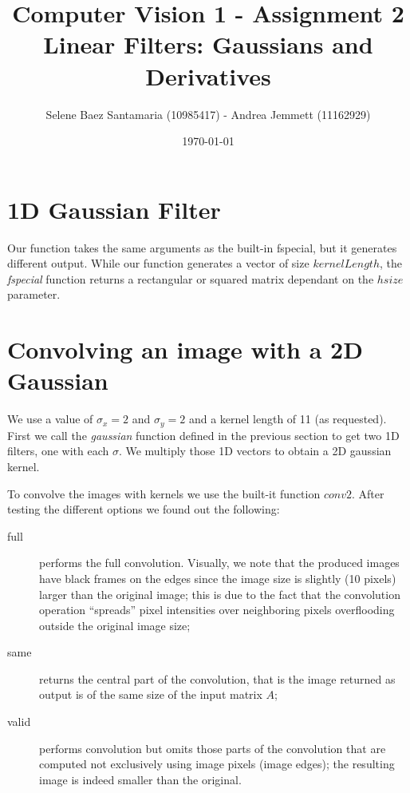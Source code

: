 \documentclass[11pt]{article}
\title{
	{Computer Vision 1 - Assignment 2 \\
	Linear Filters: Gaussians and Derivatives}
}
\author{
Selene Baez Santamaria (10985417) - Andrea Jemmett (11162929)}
\date{\today}
\begin{document}
\maketitle


\section{1D Gaussian Filter}
Our function takes the same arguments as the built-in fspecial, but it generates
different output. While our function generates a vector of size $kernelLength$,
the \emph{fspecial} function returns a rectangular or squared matrix dependant on the
$hsize$ parameter.


\section{Convolving an image with a 2D Gaussian}
We use a value of $\sigma_x = 2$ and $\sigma_y = 2$ and a kernel length of 11
(as requested). First we call the \emph{gaussian} function defined in the
previous section to get two 1D filters, one with each $\sigma$. We multiply
those 1D vectors to obtain a 2D gaussian kernel.

To convolve the images with kernels we use the built-it function $conv2$. After
testing the different options we found out the following:

\begin{description}
		\item[full] performs the full convolution. Visually, we note that the
						produced images have black frames on the edges since the image size
						is slightly (10 pixels) larger than the original image; this is due
						to the fact that the convolution operation ``spreads'' pixel
						intensities over neighboring pixels overflooding outside the
						original image size;
		\item[same] returns the central part of the convolution, that is the image
						returned as output is of the same size of the input matrix $A$;
		\item[valid] performs convolution but omits those parts of the convolution
						that are computed not exclusively using image pixels (image edges);
						the resulting image is indeed smaller than the original.
\end{description}
\end{document}
